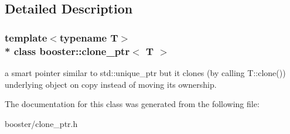 \subsection{Detailed Description}
\subsubsection*{template$<$typename T$>$\\*
class booster\+::clone\+\_\+ptr$<$ T $>$}

a smart pointer similar to std\+::unique\+\_\+ptr but it clones (by calling T\+::clone()) underlying object on copy instead of moving its ownership. 

The documentation for this class was generated from the following file\+:\begin{DoxyCompactItemize}
\item 
booster/clone\+\_\+ptr.\+h\end{DoxyCompactItemize}
